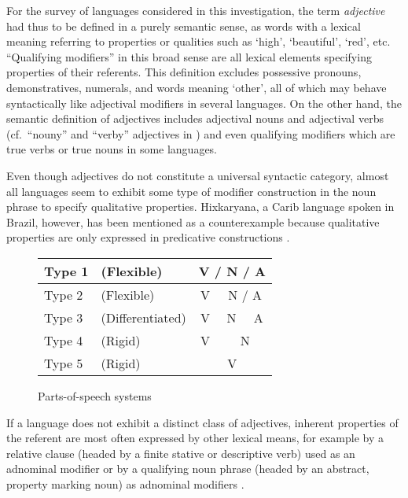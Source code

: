 For the survey of languages considered in this investigation, the term \emph{adjective} had thus to be defined in a purely semantic sense, as words with a lexical meaning referring to properties or qualities such as ‘high’, ‘beautiful’, ‘red’, etc. “Qualifying modifiers” \parencite[100, elsewhere]{rijkhoff2002} in this broad sense are all lexical elements specifying properties of their referents. This definition excludes possessive pronouns, demonstratives, numerals, and words meaning ‘other’, all of which may behave syntactically like adjectival modifiers in several languages. On the other hand, the semantic definition of adjectives includes adjectival nouns and adjectival verbs (cf.~“nouny” and “verby” adjectives in \textcite[25–34, elsewhere]{wetzer1996}) and even qualifying modifiers which are true verbs or true nouns in some languages.

Even though adjectives do not constitute a universal syntactic category, almost all languages seem to exhibit some type of modifier construction in the noun phrase to specify qualitative properties. Hixkaryana, a Carib language spoken in Brazil, however, has been mentioned as a counterexample because qualitative properties are only expressed in predicative constructions \parencites[37, 131]{derbyshire1979}[138]{rijkhoff2002}.
\begin{figure}
\begin{tabular}{|| ll || c | c | c ||}
\hline\hline
Type 1&(Flexible)&\multicolumn{3}{c||}{V / N / A}\\
\hline
Type 2&(Flexible)&V&\multicolumn{2}{c||}{N / A}\\
\hline
Type 3&(Differentiated)&V&N&A\\
\hline
Type 4&(Rigid)&V&\multicolumn{2}{c||}{N}\\
\hline
Type 5&(Rigid)&\multicolumn{3}{c||}{V}\\
\hline\hline
\end{tabular}
\caption[Parts-of-speech systems]{Parts-of-speech systems \parencite[based on][]{hengeveld-etal2004}}
\label{hengeveld adj}
\end{figure}
If a language does not exhibit a distinct class of adjectives, inherent properties of the referent are most often expressed by other lexical means, for example by a relative clause (headed by a finite stative or descriptive verb) used as an adnominal modifier or by a qualifying noun phrase (headed by an abstract, property marking noun) as adnominal modifiers \parencite[cf.][100]{rijkhoff2002}.


